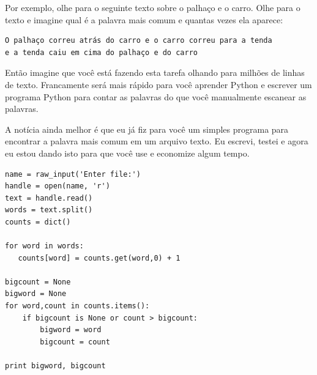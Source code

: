 Por exemplo, olhe para o seguinte texto sobre o palhaço e o carro. Olhe para o
texto e imagine qual é a palavra mais comum e quantas vezes ela aparece:
%

\beforeverb
\begin{verbatim}
O palhaço correu atrás do carro e o carro correu para a tenda
e a tenda caiu em cima do palhaço e do carro
\end{verbatim}
\afterverb

Então imagine que você está fazendo esta tarefa olhando para milhões de linhas
de texto. Francamente será mais rápido para você aprender Python e escrever um
programa Python para contar as palavras do que você manualmente escanear as
palavras.
%

A notícia ainda melhor é que eu já fiz para você um simples programa para
encontrar a palavra mais comum em um arquivo texto. Eu escrevi, testei e agora
eu estou dando isto para que você use e economize algum tempo.
%

\beforeverb
\begin{verbatim}
name = raw_input('Enter file:')
handle = open(name, 'r')
text = handle.read()
words = text.split()
counts = dict()

for word in words:
   counts[word] = counts.get(word,0) + 1

bigcount = None
bigword = None
for word,count in counts.items():
    if bigcount is None or count > bigcount:
        bigword = word
        bigcount = count

print bigword, bigcount
\end{verbatim}
\afterverb

%
%
%


